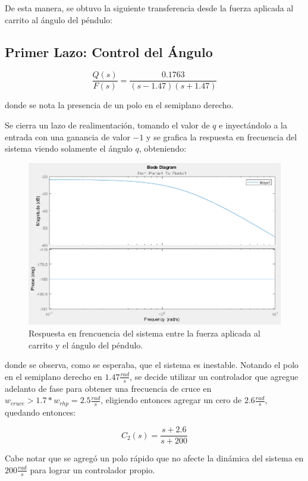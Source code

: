 De esta manera, se obtuvo la siguiente transferencia desde la fuerza aplicada al carrito al ángulo del péndulo:

\subsection{Primer Lazo: Control del Ángulo}

\begin{equation}
\frac{Q(s)}{F(s)} = \frac{0.1763}{(s-1.47)(s+1.47)}
\end{equation}

donde se nota la presencia de un polo en el semiplano derecho.

Se cierra un lazo de realimentación, tomando el valor de $q$ e inyectándolo a la entrada con una ganancia de valor $-1$ y se grafica la respuesta en frecuencia del sistema viendo solamente el ángulo $q$, obteniendo:

\begin{figure}[H]
	\centering
	\includegraphics[width=0.8\linewidth]{Imagenes/loopshaping/bode_cerrando_q}
	\caption{Respuesta en frencuencia del sistema entre la fuerza aplicada al carrito y el ángulo del péndulo.}
	\label{bode_cerrando_q}
\end{figure}

donde se observa, como se esperaba, que el sistema es inestable. Notando el polo en el semiplano derecho en $1.47 \frac{rad}{s}$, se decide utilizar un controlador que agregue adelanto de fase para obtener una frecuencia de cruce en $w_{cruce} > 1.7 * w_{rhp} = 2.5 \frac{rad}{s}$, eligiendo entonces agregar un cero de $2.6 \frac{rad}{s}$, quedando entonces:

\begin{equation}
C_2(s) = \frac{s+2.6}{s+200}
\end{equation} 

Cabe notar que se agregó un polo rápido que no afecte la dinámica del sistema en $200 \frac{rad}{s}$ para lograr un controlador propio.

